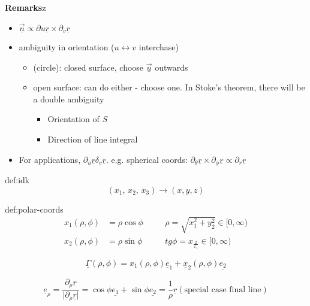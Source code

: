 \documentclass{article}
\begin{document}
\textbf{Remarks}z
\begin{itemize}
    \item $\underline{\vec{n}} \propto \partial{u}\underline{r} \times \partial_{v}\underline{r}$
    \item ambiguity in orientation ($u \leftrightarrow v$ interchase)
        \begin{itemize}
            \item (circle): closed surface, choose $\underline{\vec{u}}$ outwards
            \item open surface: can do either - choose one. In Stoke's theorem, there will be a double ambiguity
                \begin{itemize}
                    \item Orientation of $S$
                    \item Direction of line integral
                \end{itemize}
        \end{itemize}
    \item For applications, $\partial_{u}\underline{r} \delta_{v}\underline{r}$. 
        e.g. spherical coords: $\partial_{\theta}\underline{r} \times \partial_{\phi}\underline{r} \propto \partial_{r}\underline{r}$
\end{itemize}


\begin{dfn}{def:idk}{}
    \[(x_{1},\, x_{2},\,x_{3}) \to (x,y,z)\]
\end{dfn}

\begin{dfn}{def:polar-coords}{}
    \begin{align*}
        x_{1}(\rho, \phi) &= \rho\cos\phi & \quad & \rho = \sqrt{x_{1}^{2} + y_{2}^{2}}\in [0, \infty) \\
        x_{2}(\rho, \phi) &= \rho\sin\phi & \quad & tg\phi = x_\frac{{2}}{x_{1}}\in [0, \infty)
    \end{align*}

    \[\underline{\Gamma}(\rho, \phi) = x_{1}(\rho, \phi)\underline{e}_{1} + \underline{x}_{2}(\rho,\phi)\underline{e_{2}}\]
    
\end{dfn}

\[\underline{e}_{\rho} = \frac{\partial_{\rho}\underline{r}}{\lvert \partial_{\rho}\underline{r} \rvert} = \cos\phi\underline{e_{1}} + \sin\phi \underline{e_{2}} = \frac{1}{\rho}\underline{r} (\text{special case final line})\]
\end{document}
